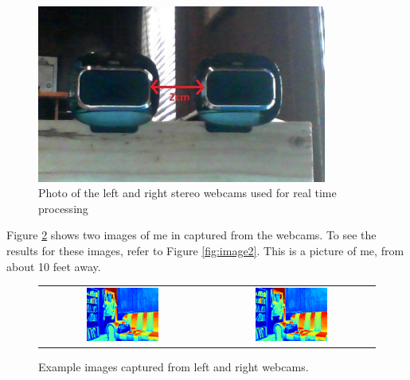 \documentclass[11pt,fleqn]{article}
\begin{document}
\begin{figure}[!h]
\begin{mdframed}
\centering
\includegraphics[width=0.85\textwidth, trim=30 50 45 50, clip]{images/setup.jpg}
\caption[Photo of the stereo webcams used for real time processing]{Photo of the left and right stereo webcams used for real time processing}
\label{fig:cam}
\end{mdframed}
\end{figure}

Figure \ref{fig:image1} shows two images of me in captured from the webcams. To see the results for these images, refer to Figure \ref{fig:image2}.
This is a picture of me, from about 10 feet away.\\

\begin{figure}[!h]
\begin{mdframed}
\centering
\setlength{}
\begin{tabular}{cc}
\includegraphics[width=0.45\textwidth]{images/l.png} &
\includegraphics[width=0.45\textwidth]{images/r.png} \\[2pt]
\end{tabular}
\caption[Example images captured from webcams]{Example images captured from left and right webcams.}
\label{fig:image1}
\end{mdframed}
\end{figure}
\end{document}
